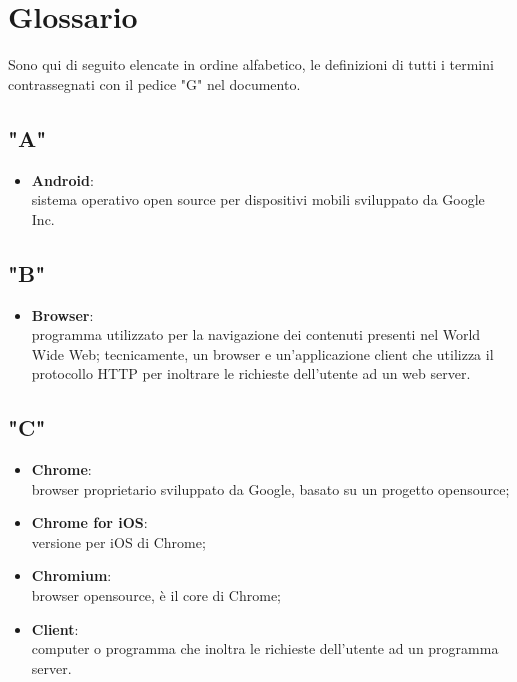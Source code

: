 \section{Glossario}
\label{glossario}

Sono qui di seguito elencate in ordine alfabetico, le definizioni di tutti i termini contrassegnati con il pedice "G" nel documento.

\subsection*{"A"}
\begin{itemize}
\item \textbf{Android}:\\ sistema operativo open source per dispositivi mobili sviluppato da Google Inc.
\end{itemize}
\subsection*{"B"}
\begin{itemize}
\item \textbf{Browser}:\\ programma utilizzato per la navigazione dei contenuti presenti nel World Wide Web;
tecnicamente, un browser e un’applicazione client che utilizza il protocollo HTTP per inoltrare le richieste dell’utente ad un web server.
\end{itemize}

\subsection*{"C"}
\begin{itemize}
\item \textbf{Chrome}:\\ browser proprietario sviluppato da Google, basato su un progetto opensource;
\item \textbf{Chrome for iOS}:\\ versione per iOS di Chrome;
\item \textbf{Chromium}:\\ browser opensource, è il core di Chrome;
\item \textbf{Client}:\\ computer o programma che inoltra le richieste dell’utente ad un programma server.
\end{itemize}

